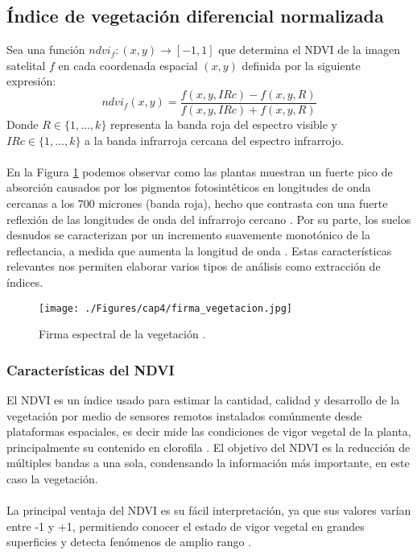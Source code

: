 \subsection{\'Indice de vegetaci\'on diferencial normalizada}\label{subsec:ndvi}
Sea una funci\'on $ ndvi_{f}:(x,y) \longrightarrow [-1,1] $ que determina el NDVI de la imagen satelital $ f $ en cada coordenada espacial $ (x,y) $ definida por la siguiente expresi\'on:
\begin{equation}
\label{e:ndvi}
ndvi_{f}(x,y)=\dfrac{f(x,y,IRc)-f(x,y,R)}{f(x,y,IRc)+f(x,y,R)}
\end{equation}
Donde $ R \in \{1,...,k\}$ representa la banda roja del espectro visible y  $ IRc \in \{1,...,k\}$ a la banda infrarroja cercana del espectro infrarrojo.\\~\\
En la Figura \ref{fig:firmaVegetacion} podemos observar como las plantas muestran un fuerte pico de absorci\'on causados por los pigmentos fotosint\'eticos en longitudes de onda cercanas a los 700 micrones (banda roja), hecho que contrasta con una fuerte reflexi\'on de las longitudes de onda del infrarrojo cercano \cite{salinero2002teledeteccion}. Por su parte, los suelos desnudos se caracterizan por un incremento suavemente monot\'onico de la reflectancia, a medida que aumenta la longitud de onda \cite{salinero2002teledeteccion}. Estas caracter\'isticas relevantes nos permiten elaborar varios tipos de an\'alisis como extracci\'on de \'indices.
\begin{figure}[H]
	\centering
	\texttt{[image: ./Figures/cap4/firma\_vegetacion.jpg]}
	\caption{Firma espectral de la vegetaci\'on \cite{ndvi2015com}.}
	\label{fig:firmaVegetacion}
\end{figure}

\subsubsection{Caracter\'isticas del NDVI}\label{subsec:subndvi}
El NDVI es un \'indice usado para estimar la cantidad, calidad y desarrollo de la vegetaci\'on por medio de sensores remotos instalados com\'unmente desde plataformas espaciales, es decir mide las condiciones de vigor vegetal de la planta, principalmente su contenido en clorofila \cite{salinero2002teledeteccion}. El objetivo del NDVI es la reducci\'on de m\'ultiples bandas a una sola, condensando la informaci\'on m\'as importante, en este caso la vegetaci\'on.\\~\\
La principal ventaja del NDVI es su f\'acil interpretaci\'on, ya que sus valores var\'ian entre -1 y +1, permitiendo conocer el estado de vigor vegetal en grandes superficies y detecta fen\'omenos de amplio rango \cite{salinero2002teledeteccion}.

